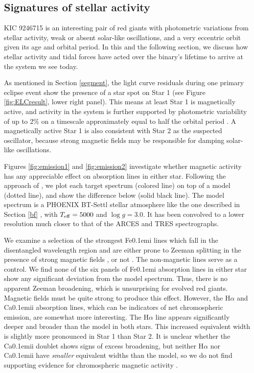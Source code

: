 \subsection{Signatures of stellar activity}\label{actrot}
KIC 9246715 is an interesting pair of red giants with photometric variations from stellar activity, weak or absent solar-like oscillations, and a very eccentric orbit given its age and orbital period. In this and the following section, we discuss how stellar activity and tidal forces have acted over the binary's lifetime to arrive at the system we see today.

As mentioned in Section \ref{segment}, the light curve residuals during one primary eclipse event show the presence of a star spot on Star 1 (see Figure \ref{fig:ELCresult}, lower right panel). This means at least Star 1 is magnetically active, and activity in the system is further supported by photometric variability of up to 2\% on a timescale approximately equal to half the orbital period \citep{gau14}. A magnetically active Star 1 is also consistent with Star 2 as the suspected oscillator, because strong magnetic fields may be responsible for damping solar-like oscillations.

Figures \ref{fig:emission1} and \ref{fig:emission2} investigate whether magnetic activity has any appreciable effect on absorption lines in either star. Following the approach of \citet{fro12}, we plot each target spectrum (colored line) on top of a model (dotted line), and show the difference below (solid black line). The model spectrum is a PHOENIX BT-Settl stellar atmosphere like the one described in Section \ref{bf} \citep{all03,asp09}, with $T_{\rm{eff}} = 5000$ and $\log g = 3.0$. It has been convolved to a lower resolution much closer to that of the ARCES and TRES spectrographs.

We examine a selection of the strongest {\rm Fe}\kern 0.1em{\sc i} lines which fall in the disentangled wavelength region and are either prone to Zeeman splitting in the presence of strong magnetic fields \citep{har73}, or not \citep{sis70}. The non-magnetic lines serve as a control. We find none of the six panels of {\rm Fe}\kern 0.1em{\sc i} absorption lines in either star show any significant deviation from the model spectrum. Thus, there is no apparent Zeeman broadening, which is unsurprising for evolved red giants. Magnetic fields must be quite strong to produce this effect. However, the H$\alpha$ and {\rm Ca}\kern 0.1em{\sc ii} absorption lines, which can be indicators of net chromospheric emission, are somewhat more interesting. The H$\alpha$ line appears significantly deeper and broader than the model in both stars. This increased equivalent width is slightly more pronounced in Star 1 than Star 2. It is unclear whether the {\rm Ca}\kern 0.1em{\sc ii} doublet shows signs of excess broadening, but neither H$\alpha$ nor {\rm Ca}\kern 0.1em{\sc ii} have \emph{smaller} equivalent widths than the model, so we do not find supporting evidence for chromospheric magnetic activity \citep{fro12}.
